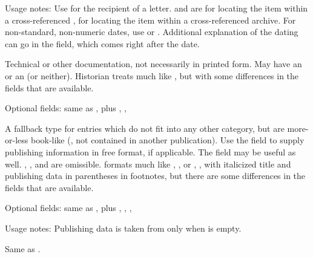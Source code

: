 \documentclass{ltxdockit}[2010/02/12]
\begin{document}
\begin{typelist}
Usage notes: Use  for the recipient of a letter.  and  are for locating the item within a cross-referenced ,  for locating the item within a cross-referenced  archive.
For non-standard, non-numeric dates, use  or . Additional explanation of the dating can go in the field, which comes right after the date.



Technical or other documentation, not necessarily in printed form. May have an  or an  (or neither). Historian treats  much like , but with some differences in the fields that are available.

\item Optional fields: same as , plus , , 




A fallback type for entries which do not fit into any other category, but are more-or-less book-like (\ie, not contained in another publication). 
Use the field  to supply publishing information in free format, if applicable. The field  may be useful as well. , , and  are omissible. 
 formats  much like , , or , \ie, with italicized title and publishing data in parentheses in footnotes, but there are some differences in the fields that are available.

\item Optional fields: same as , plus , , , 

Usage notes: Publishing data is taken from  only when  is empty.




 Same as .





\end{typelist}
\end{document}
